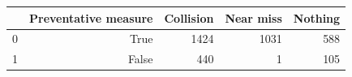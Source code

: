 \begin{tabular}{lrrrr}
\toprule
 & Preventative measure & Collision & Near miss & Nothing \\
\midrule
0 & True & 1424 & 1031 & 588 \\
1 & False & 440 & 1 & 105 \\
\bottomrule
\end{tabular}
